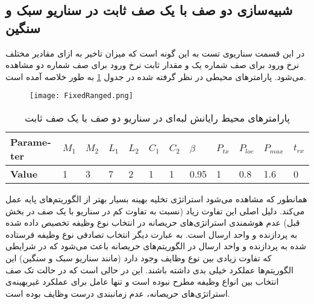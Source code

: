 \subsection{شبیه‌سازی دو صف با یک صف ثابت در سناریو سبک و سنگین}
در این قسمت سناریوی تست به این گونه است که میزان تاخیر به ازای مقادیر مختلف نرخ ورود برای صف شماره یک و مقدار ثابت نرخ ورود برای صف شماره دو مشاهده می‌شود. پارامترهای محیطی در نظر گرفته شده در جدول \ref{table:fixedranged} به طور خلاصه آمده است.
\begin{figure}
	\texttt{[image: FixedRanged.png]}
\end{figure}
\begin{table}
	\centering
	\begin{latin}
		\begin{tabular}{@{}llllllllllll@{}}
			\toprule
			\textbf{Parameter} & $M_1$ & $M_2$ & $L_1$ & $L_2$ & $C_1$ & $C_2$ & $\beta$ & $P_{tx}$ & $P_{loc}$ & $P_{max}$ & $t_{rx}$ \\ \midrule
			\textbf{Value}     & 1     & 3     & 7     & 2     & 1     & 1     & 0.95    & 1        & 0.8       & 1.6       & 0        \\ \bottomrule
		\end{tabular}
	\end{latin}
	\caption{پارامترهای محیط رایانش لبه‌ای در سناریو دو صف با یک صف ثابت}
	\label{table:fixedranged}
\end{table}
همانطور که مشاهده می‌شود استراتژی تخلیه بهینه بسیار بهتر از الگوریتم‌های پایه عمل می‌کند. دلیل اصلی این تفاوت زیاد (نسبت به تفاوت کم در سناریو با یک صف در بخش قبل) عدم هوشمندی استراتژی‌های حریصانه در انتخاب نوع وظیفه تخصیص داده شده به پردازنده و واحد ارسال است. به عبارت دیگر انتخاب تصادفی نوع وظیفه فرستاده شده به پردازنده و واحد ارسال در الگوریتم‌های حریصانه باعث می‌شود که در شرایطی که تفاوت زیادی بین نوع وظایف وجود دارد (مانند سناریو سبک و سنگین) این الگوریتم‌ها عملکرد خیلی بدی داشته باشند. این در حالی است که در حالت تک صف انتخاب بین انواع وظیفه مطرح نبوده است و تنها عامل برای عملکرد غیربهینه‌ی استراتژی‌های حریصانه، عدم زمانبندی درست وظایف بوده است.
